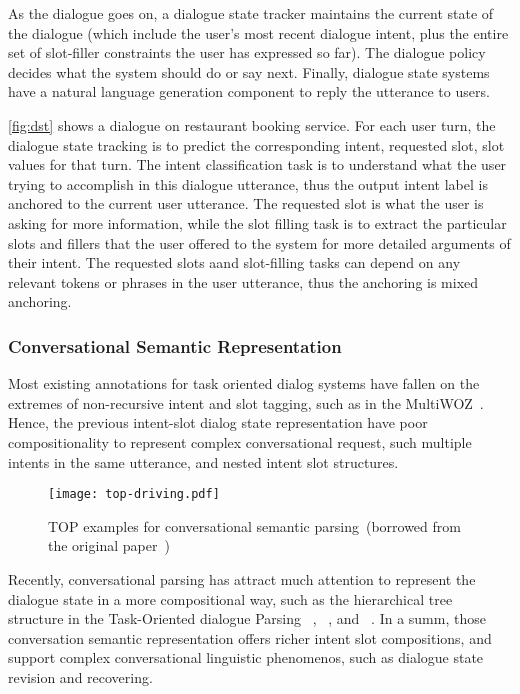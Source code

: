 As the dialogue goes on, a dialogue state tracker maintains the
current state of the dialogue (which include the user's most recent
dialogue intent, plus the entire set of slot-filler constraints the
user has expressed so far). The dialogue policy decides what the
system should do or say next. Finally, dialogue state systems have a
natural language generation component to reply the utterance to users.

\autoref{fig:dst} shows a dialogue on restaurant booking service. For
each user turn, the dialogue state tracking is to predict the
corresponding intent, requested slot, slot values for that turn. The
intent classification task is to understand what the user trying to
accomplish in this dialogue utterance, thus the output intent label is
anchored to the current user utterance. The requested slot is what the
user is asking for more information, while the slot filling task is to
extract the particular slots and fillers that the user offered to the
system for more detailed arguments of their intent. The requested
slots aand slot-filling tasks can depend on any relevant tokens or
phrases in the user utterance, thus the anchoring is mixed anchoring.

\subsubsection{Conversational Semantic Representation}
\label{ssec:bg:dialogue-rep}
Most existing annotations for task oriented dialog systems have fallen
on the extremes of non-recursive intent and slot tagging, such as in
the MultiWOZ~\cite{budzianowski2018multiwoz}. Hence, the previous
intent-slot dialog state representation have poor compositionality to
represent complex conversational request, such multiple intents in the
same utterance, and nested intent slot structures.
\begin{figure}[!th]
\centering
\texttt{[image: top-driving.pdf]}
\caption{\label{fig:top-example} TOP examples for conversational
  semantic parsing~(borrowed from the original
  paper~\citep{gupta-etal-2018-semantic-parsing})}
\end{figure}

Recently, conversational parsing has attract much attention to
represent the dialogue state in a more compositional way, such as the
hierarchical tree structure in the Task-Oriented dialogue Parsing
~\cite[TOP,][]{gupta-etal-2018-semantic-parsing,aghajanyan2020conversational},
~\cite[TreeDST,][]{cheng2020conversational}, and
~\cite[Dataflow,][]{andreas2020task}. In a summ, those conversation
semantic representation offers richer intent slot compositions, and
support complex conversational linguistic phenomenos, such as dialogue
state revision and recovering.

